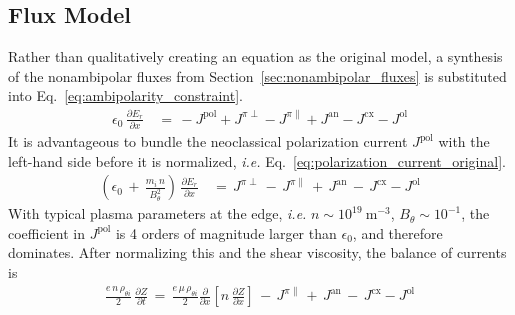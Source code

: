 \subsection{Flux Model}\label{ssec:flux_Z_equation}
Rather than qualitatively creating an equation as the original model, a synthesis of the nonambipolar fluxes from Section~\ref{sec:nonambipolar_fluxes} is substituted into Eq.~\ref{eq:ambipolarity_constraint}.
\begin{align}
	\epsilon_0 \, \frac{\partial E_r}{\partial x} \,&=\, -J^\text{pol}
		+ J^{\pi\perp} - J^{\pi\parallel} + J^\text{an} - J^\text{cx}
		- J^\text{ol} \label{eq:current_sum}
\end{align}
It is advantageous to bundle the neoclassical polarization current $J^\text{pol}$ with the left-hand side before it is normalized, \emph{i.e.} Eq.~\ref{eq:polarization_current_original}.
\begin{align}
	\left(\epsilon_0 \,+\, \frac{m_i \, n}{B_\theta^2}\right) \,
	\frac{\partial E_r}{\partial x} \,&=\, J^{\pi\perp} \,-\, J^{\pi\parallel} \,+\, J^\text{an} \,-\, J^\text{cx} - J^\text{ol}
\end{align}
With typical plasma parameters at the edge, \emph{i.e.} $n \sim 10^{19}~\text{m}^{-3}$, $B_\theta \sim 10^{-1}$, the coefficient in $J^\text{pol}$ is 4 orders of magnitude larger than $\epsilon_0$, and therefore dominates.
After normalizing this and the shear viscosity, the balance of currents is
\begin{align}
	\frac{e \, n \, \rho_{\theta i}}{2} \, \frac{\partial Z}{\partial t}
		\,=\, \frac{e \, \mu \, \rho_{\theta i}}{2} \frac{\partial}{\partial x}
		\left[n \, \frac{\partial Z}{\partial x}\right] \,-\,
		J^{\pi\parallel} \,+\, J^\text{an} \,-\, J^\text{cx} - J^\text{ol}
		\label{eq:normalized_Z_equation}
\end{align}
